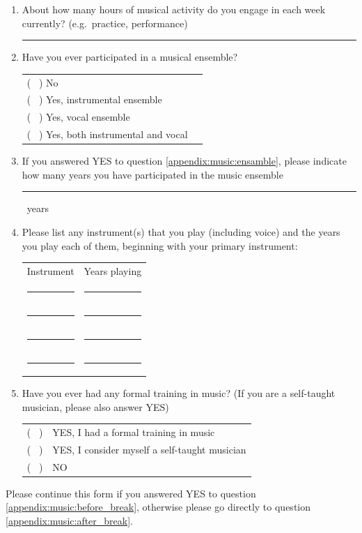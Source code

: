 \documentclass[a4paper,11pt]{article}
\newcommand{\myunderline}{\rule{2in}{.5pt}}
\begin{document}
{\begin{appendices}
\begin{enumerate}[resume]
	\item About how many hours of musical activity do you engage in each week currently? (e.g.\ practice, performance)

	\myunderline

	\item \label{appendix:music:ensamble}Have you ever participated in a musical ensemble?

	\begin{tabular}{l l}
		( \ ) No \\
		( \ ) Yes, instrumental ensemble \\
		( \ ) Yes, vocal ensemble \\
		( \ ) Yes, both instrumental and vocal \\
	\end{tabular}

	\item If you answered YES to question \ref{appendix:music:ensamble}, please indicate how many years you have participated in the music ensemble

	\myunderline \ years

	\item Please list any instrument(s) that you play (including voice) and the years you play each of them, beginning with your primary instrument:

	\begin{tabular}{c c}
		Instrument &  Years playing \\
		\myunderline & \myunderline \\
		\myunderline & \myunderline \\
		\myunderline & \myunderline \\
		\myunderline & \myunderline \\
	\end{tabular}
	
	\item \label{appendix:music:before_break}Have you ever had any formal training in music? (If you are a self-taught musician, please also answer YES)

	\begin{tabular}{l l}
		( \ ) & YES, I had a formal training in music \\
		( \ ) & YES, I consider myself a self-taught musician \\
		( \ ) & NO \\
	\end{tabular}

\end{enumerate}
Please continue this form if you answered YES to question \ref{appendix:music:before_break}, otherwise please go directly to question \ref{appendix:music:after_break}.
\begin{enumerate}[resume]


\end{enumerate}
\end{appendices}}
\end{document}
